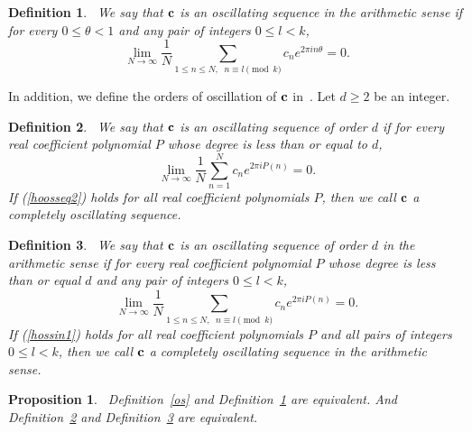 \documentclass[12pt,letterpaper]{amsart}
\newtheorem {definition}{Definition}
\newtheorem {proposition}{Proposition}
\begin{document}
\medskip
\begin{definition}~\label{osas}
We say that ${\bf c}$ is an oscillating sequence in the arithmetic sense if for every $0\leq \theta <1$ and any pair of integers $0\leq l<k$,
\begin{equation}~\label{hossin}
\lim_{N\to \infty} \frac{1}{N} \sum_{1\leq n\leq N, \;\; n\equiv l \pmod{k}} c_{n}e^{2\pi i n\theta}=0.
\end{equation}
 \end{definition}
 
In addition, we define the orders of oscillation of ${\bf c}$ in~\cite{JPAMS}.  
Let $d\geq 2$ be an integer. 

\medskip
\begin{definition}~\label{hooss}
We say that ${\bf c}$ is an oscillating sequence of order $d$ if for every real coefficient polynomial $P$ whose degree is less than or equal to $d$,
\begin{equation}~\label{hoosseq2}
\lim_{N\to \infty} \frac{1}{N} \sum_{n=1}^{N} c_{n}e^{2\pi i P(n)}=0.
\end{equation} 
If (\ref{hoosseq2}) holds for all real coefficient polynomials $P$, then we call ${\bf c}$ a completely oscillating sequence.
\end{definition} 

\medskip
\begin{definition}~\label{hoossas}
We say that ${\bf c}$ is an oscillating sequence of order $d$ in the arithmetic sense if for every real coefficient polynomial $P$ whose degree is less than or equal $d$ and any pair of integers $0\leq l<k$,
\begin{equation}~\label{hossin1}
\lim_{N\to \infty} \frac{1}{N} \sum_{1\leq n\leq N, \;\; n\equiv l \pmod{k}} c_{n}e^{2\pi i P(n)}=0.
\end{equation}
If (\ref{hossin1}) holds for all real coefficient polynomials $P$ and all pairs of integers $0\leq l<k$, then we call ${\bf c}$ a completely oscillating sequence in the arithmetic sense.
 \end{definition}
 
 \medskip
 \begin{proposition}~\label{prop1}
 Definition~\ref{os} and Definition~\ref{osas} are equivalent. And Definition~\ref{hooss} and Definition~\ref{hoossas} are equivalent.  
 \end{proposition}
 
\end{document}
